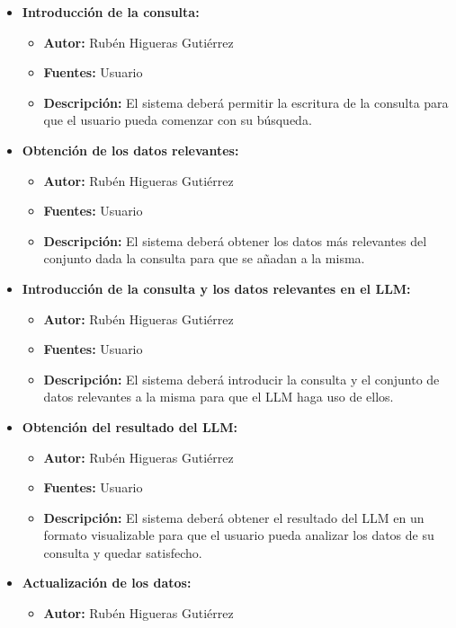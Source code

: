 \begin{itemize}
    \item \textbf{Introducción de la consulta:}
    \begin{itemize}
        \item \textbf{Autor:} Rubén Higueras Gutiérrez
        \item \textbf{Fuentes:} Usuario
        \item \textbf{Descripción:} El sistema deberá permitir la escritura de la consulta para que el usuario pueda comenzar con su búsqueda.
    \end{itemize}
    \item \textbf{Obtención de los datos relevantes:}
    \begin{itemize}
        \item \textbf{Autor:} Rubén Higueras Gutiérrez
        \item \textbf{Fuentes:} Usuario
        \item \textbf{Descripción:} El sistema deberá obtener los datos más relevantes del conjunto dada la consulta para que se añadan a la misma.
    \end{itemize}
    \item \textbf{Introducción de la consulta y los datos relevantes en el LLM:}
    \begin{itemize}
        \item \textbf{Autor:} Rubén Higueras Gutiérrez
        \item \textbf{Fuentes:} Usuario
        \item \textbf{Descripción:} El sistema deberá introducir la consulta y el conjunto de datos relevantes a la misma para que el LLM haga uso de ellos.
    \end{itemize}
    \item \textbf{Obtención del resultado del LLM:}
    \begin{itemize}
        \item \textbf{Autor:} Rubén Higueras Gutiérrez
        \item \textbf{Fuentes:} Usuario
        \item \textbf{Descripción:} El sistema deberá obtener el resultado del LLM en un formato visualizable para que el usuario pueda analizar los datos de su consulta y quedar satisfecho.
    \end{itemize}
    \item \textbf{Actualización de los datos:}
    \begin{itemize}
        \item \textbf{Autor:} Rubén Higueras Gutiérrez

\end{itemize}
\end{itemize}
